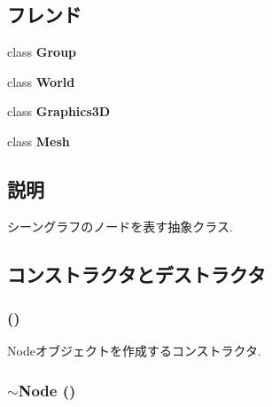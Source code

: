 \subsection*{フレンド}
\begin{CompactItemize}
\item 
\hypertarget{classm3g_1_1Node_2697825715974a353728f0d4d5658112}{
class \textbf{Group}}
\label{classm3g_1_1Node_2697825715974a353728f0d4d5658112}

\item 
\hypertarget{classm3g_1_1Node_7b4bcdf992c21ae83363f25df05b1d25}{
class \textbf{World}}
\label{classm3g_1_1Node_7b4bcdf992c21ae83363f25df05b1d25}

\item 
\hypertarget{classm3g_1_1Node_8174d4c629550c1ee279571250236ef4}{
class \textbf{Graphics3D}}
\label{classm3g_1_1Node_8174d4c629550c1ee279571250236ef4}

\item 
\hypertarget{classm3g_1_1Node_a41a130f156b145bffb3f4b5172c4c93}{
class \textbf{Mesh}}
\label{classm3g_1_1Node_a41a130f156b145bffb3f4b5172c4c93}

\end{CompactItemize}


\subsection{説明}
シーングラフのノードを表す抽象クラス. 

\subsection{コンストラクタとデストラクタ}
\hypertarget{classm3g_1_1Node_0d313fac56abd7ebe58a17f1530b879e}{
\subsubsection[{Node}]{ ()}}
\label{classm3g_1_1Node_0d313fac56abd7ebe58a17f1530b879e}


Nodeオブジェクトを作成するコンストラクタ. \hypertarget{classm3g_1_1Node_6fa6bf60f34f1e3efb0e59333428c9c8}{
\subsubsection[{$\sim$Node}]{\setlength{\rightskip}{0pt plus 5cm}$\sim${\bf Node} ()}}
\label{classm3g_1_1Node_6fa6bf60f34f1e3efb0e59333428c9c8}


